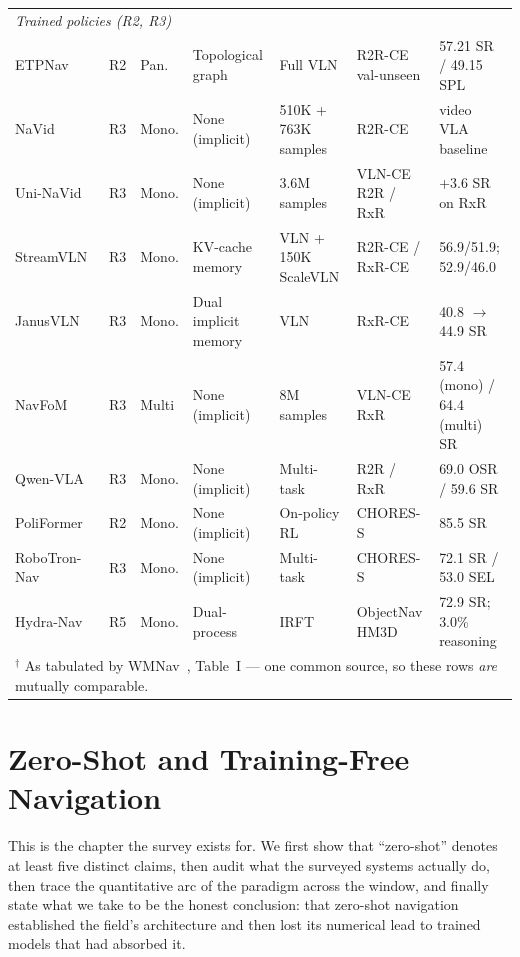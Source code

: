 \documentclass[journal]{IEEEtran}
\begin{document}
\begin{table}[!t]
\begin{tabular}{lllllll}
    \midrule
    \multicolumn{7}{l}{\itshape Trained policies (R2, R3)} \\
    ETPNav~\cite{an2025etpnav}            & R2 & Pan.   & Topological graph   & Full VLN               & R2R-CE val-unseen & 57.21 SR / 49.15 SPL \\
    NaVid~\cite{zhang2024navid}           & R3 & Mono.  & None (implicit)     & 510K + 763K samples    & R2R-CE & video VLA baseline \\
    Uni-NaVid~\cite{zhang2024navidb}      & R3 & Mono.  & None (implicit)     & 3.6M samples           & VLN-CE R2R / RxR & +3.6 SR on RxR \\
    StreamVLN~\cite{wei2025streamvln}     & R3 & Mono.  & KV-cache memory & VLN + 150K ScaleVLN & R2R-CE / RxR-CE & 56.9/51.9; 52.9/46.0 \\
    JanusVLN~\cite{zeng2025janusvln}      & R3 & Mono.  & Dual implicit memory & VLN                   & RxR-CE & 40.8 $\to$ 44.9 SR \\
    NavFoM~\cite{zhang2025embodied}       & R3 & Multi  & None (implicit)     & 8M samples             & VLN-CE RxR & 57.4 (mono) / 64.4 (multi) SR \\
    Qwen-VLA~\cite{wang2026qwen}          & R3 & Mono.  & None (implicit)     & Multi-task             & R2R / RxR & 69.0 OSR / 59.6 SR \\
    PoliFormer~\cite{zeng2024poliformer}  & R2 & Mono.  & None (implicit)     & On-policy RL           & CHORES-S & 85.5 SR \\
    RoboTron-Nav~\cite{zhong2025robotron} & R3 & Mono.  & None (implicit)     & Multi-task             & CHORES-S & 72.1 SR / 53.0 SEL \\
    Hydra-Nav~\cite{wang2026hydra}        & R5 & Mono.  & Dual-process & IRFT & ObjectNav HM3D & 72.9 SR; 3.0\% reasoning \\
    \bottomrule
    \multicolumn{7}{l}{\footnotesize $^\dagger$ As tabulated by WMNav~\cite{nie2025wmnav}, Table~I --- one common source, so these rows \emph{are} mutually comparable.}
  \end{tabular}
\end{table}
\section{Zero-Shot and Training-Free Navigation}\label{sec:zeroshot}
This is the chapter the survey exists for. We first show that ``zero-shot''
denotes at least five distinct claims, then audit what the surveyed systems
actually do, then trace the quantitative arc of the paradigm across the
window, and finally state what we take to be the honest conclusion: that
zero-shot navigation established the field's architecture and then lost
its numerical lead to trained models that had absorbed it.
\end{document}

